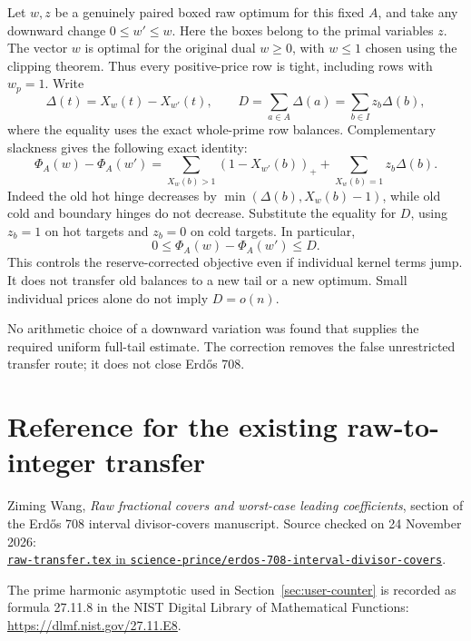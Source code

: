 \documentclass[a4paper,11pt]{article}
\theoremstyle{remark}\newtheorem{remark}[theorem]{Remark}
\begin{document}
Let $w,z$ be a genuinely paired boxed raw optimum for this fixed $A$, and take any downward change $0\le w'\le w$. Here the boxes belong to the primal variables $z$. The vector $w$ is optimal for the original dual $w\ge0$, with $w\le1$ chosen using the clipping theorem. Thus every positive-price row is tight, including rows with $w_p=1$. Write
\[
 \Delta(t)=X_w(t)-X_{w'}(t),\qquad
 D=\sum_{a\in A}\Delta(a)=\sum_{b\in I}z_b\Delta(b),
\]
where the equality uses the exact whole-prime row balances. Complementary slackness gives the following exact identity:
\begin{equation}\label{eq:pruning}
 \boxed{\Phi_A(w)-\Phi_A(w')
 =\sum_{X_w(b)>1}(1-X_{w'}(b))_+
   +\sum_{X_w(b)=1}z_b\Delta(b).}
\end{equation}
Indeed the old hot hinge decreases by $\min(\Delta(b),X_w(b)-1)$, while old cold and boundary hinges do not decrease. Substitute the equality for $D$, using $z_b=1$ on hot targets and $z_b=0$ on cold targets. In particular,
\[
 0\le\Phi_A(w)-\Phi_A(w')\le D.
\]
This controls the reserve-corrected objective even if individual kernel terms jump. It does not transfer old balances to a new tail or a new optimum. Small individual prices alone do not imply $D=o(n)$.

No arithmetic choice of a downward variation was found that supplies the required uniform full-tail estimate. The correction removes the false unrestricted transfer route; it does not close Erd\H{o}s 708.

\section*{Reference for the existing raw-to-integer transfer}
Ziming Wang, \emph{Raw fractional covers and worst-case leading coefficients}, section of the Erd\H{o}s 708 interval divisor-covers manuscript. Source checked on 24 November 2026:\\
\href{https://github.com/science-prince/erdos-708-interval-divisor-covers/blob/main/papers/main-paper/raw-transfer.tex}{\texttt{raw-transfer.tex} in \texttt{science-prince/erdos-708-interval-divisor-covers}}.
\par\medskip
The prime harmonic asymptotic used in Section~\ref{sec:user-counter} is recorded as formula 27.11.8 in the NIST Digital Library of Mathematical Functions: \url{https://dlmf.nist.gov/27.11.E8}.
\end{document}
